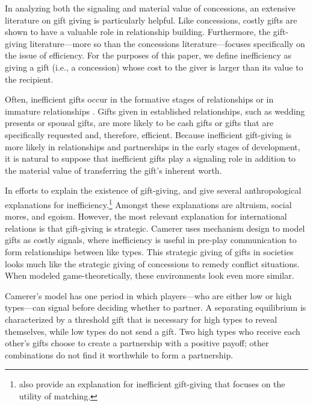 \documentclass[bibtex,autowc]{apsr_submission}
\begin{document}
In analyzing both the signaling and material value of concessions, an extensive literature on gift giving is particularly helpful. Like concessions, costly gifts are shown to have a valuable role in relationship building. Furthermore, the gift-giving literature---more so than the concessions literature---focuses specifically on the issue of efficiency. For the purposes of this paper, we define inefficiency as giving a gift (i.e., a concession) whose cost to the giver is larger than its value to the recipient. 

Often, inefficient gifts occur in the formative stages of relationships or in immature relationships \citep{camerer1988}. Gifts given in established relationships, such as wedding presents or spousal gifts, are more likely to be cash gifts or gifts that are specifically requested and, therefore, efficient. Because inefficient gift-giving is more likely in relationships and partnerships in the early stages of development, it is natural to suppose that inefficient gifts play a signaling role in addition to the material value of transferring the gift's inherent worth. 

In efforts to explain the existence of gift-giving, \cite{camerer1988} and \cite{van2000economics} give several anthropological explanations for inefficiency.\footnote{\cite{prendergast2001} also provide an explanation for inefficient gift-giving that focuses on the utility of matching.} Amongst these explanations are altruism, social mores, and egoism. However, the most relevant explanation for international relations is that gift-giving is strategic. Camerer uses mechanism design to model gifts as costly signals, where inefficiency is useful in pre-play communication to form relationships between like types. This strategic giving of gifts in societies looks much like the strategic giving of concessions to remedy conflict situations. When modeled game-theoretically, these environments look even more similar.

Camerer's model has one period in which players---who are either low or high types---can signal before deciding whether to partner. A separating equilibrium is characterized by a threshold gift that is necessary for high types to reveal themselves, while low types do not send a gift. Two high types who receive each other's gifts choose to create a partnership with a positive payoff; other combinations do not find it worthwhile to form a partnership.
\end{document}

